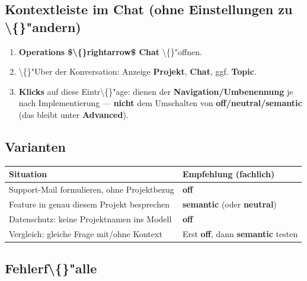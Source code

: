 \subsection{Kontextleiste im Chat (ohne Einstellungen zu \textbackslash\{\}"andern)}

\begin{enumerate}
\item \textbf{Operations \$\textbackslash\{\}rightarrow\$ Chat} \textbackslash\{\}"offnen.
\item \textbackslash\{\}"Uber der Konversation: Anzeige \textbf{Projekt}, \textbf{Chat}, ggf. \textbf{Topic}.
\item \textbf{Klicks} auf diese Eintr\textbackslash\{\}"age: dienen der \textbf{Navigation/Umbenennung} je nach Implementierung --- \textbf{nicht} dem Umschalten von \textbf{off/neutral/semantic} (das bleibt unter \textbf{Advanced}).
\end{enumerate}

\subsection{Varianten}

\begin{center}
\begin{tabular}{ll}
\hline
Situation & Empfehlung (fachlich) \\
\hline
Support-Mail formulieren, ohne Projektbezug & \textbf{off} \\
Feature in genau diesem Projekt besprechen & \textbf{semantic} (oder \textbf{neutral}) \\
Datenschutz: keine Projektnamen ins Modell & \textbf{off} \\
Vergleich: gleiche Frage mit/ohne Kontext & Erst \textbf{off}, dann \textbf{semantic} testen \\
\hline
\end{tabular}
\end{center}

\subsection{Fehlerf\textbackslash\{\}"alle}

